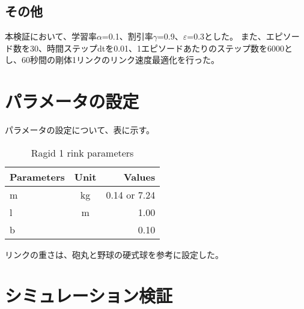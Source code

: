 \subsection{その他}
本検証において、学習率$\alpha$=0.1、割引率$\gamma$=0.9、$\varepsilon$=0.3とした。
また、エピソード数を30、時間ステップdtを0.01、1エピソードあたりのステップ数を6000とし、60秒間の剛体1リンクのリンク速度最適化を行った。
\section{パラメータの設定}
パラメータの設定について、表に示す。
\begin{table}[tb]
  \begin{center}
    \caption{Ragid 1 rink parameters}
    \begin{tabular}{l|c|r}
      \hline
      Parameters & Unit & Values \\
      \hline
      m & kg & 0.14 or 7.24 \\
      l & m & 1.00 \\
      b &  & 0.10 \\
      \hline
    \end{tabular}
  \end{center}
\end{table}
リンクの重さは、砲丸と野球の硬式球を参考に設定した。
\section{シミュレーション検証}

